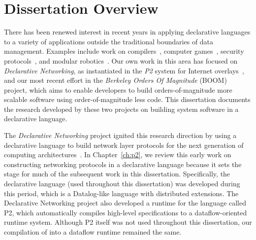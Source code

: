 \chapter[Dissertation Overview]{Dissertation Overview}
\label{ch:overview}

There has been renewed interest in recent years in applying declarative languages to a variety of 
applications outside the traditional boundaries of data management. Examples include work on 
compilers~\cite{lam05context}, computer games~\cite{white-sigmod07}, security protocols~\cite{li-padl03}, 
and modular robotics~\cite{ashley-iros07}. Our own work in this area has focused on {\em Declarative Networking},
as instantiated in the {\em P2} system for Internet overlays~\cite{p2:sosp, loo-sigmod06}, and our most recent effort in
the {\em Berkeley Orders Of Magnitude} (BOOM) project, which aims to enable developers to build orders-of-magnitude more
scalable software using order-of-magnitude less code. This dissertation documents the research developed by these two
projects on building system software in a declarative language. 

The {\em Declarative Networking} project ignited this research direction by using a declarative language to build network layer
protocols for the next generation of computing architectures~\cite{boon-thesis}. In Chapter~\ref{ch:p2}, we review this early work
on constructing networking protocols in a declarative language because it sets the stage for much of the subsequent work
in this dissertation. Specifically, the declarative language \OVERLOG (used throughout this dissertation) was developed during this period, which is a 
Datalog-like language with distributed extensions. The Declarative Networking project also developed a runtime for the \OVERLOG language called P2, 
which automatically compiles high-level specifications to a dataflow-oriented runtime system. Although P2 itself was not used 
throughout this dissertation, our compilation of \OVERLOG into a dataflow runtime remained the same.

